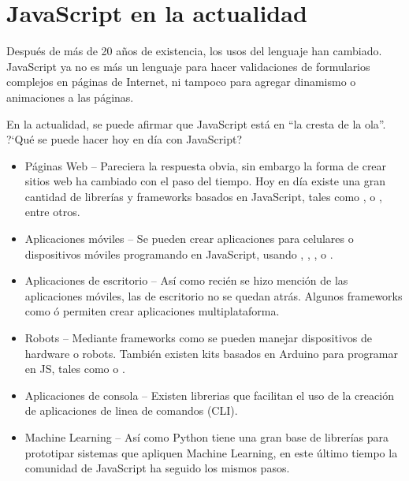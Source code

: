 \section{JavaScript en la actualidad}

Después de más de 20 años de existencia, los usos del lenguaje han cambiado. JavaScript ya no es más un lenguaje para hacer validaciones de formularios complejos en páginas de Internet, ni tampoco para agregar dinamismo o animaciones a las páginas.

En la actualidad, se puede afirmar que JavaScript está en "`la cresta de la ola"'. ?`Qué se puede hacer hoy en día con JavaScript?

\begin{itemize}
	\item Páginas Web -- Pareciera la respuesta obvia, sin embargo la forma de crear sitios web ha cambiado con el paso del tiempo. Hoy en día existe una gran cantidad de librerías y frameworks basados en JavaScript, tales como ,  o , entre otros.
	\item Aplicaciones móviles -- Se pueden crear aplicaciones para celulares o dispositivos móviles programando en JavaScript, usando , , ,  o .
	\item Aplicaciones de escritorio -- Así como recién se hizo mención de las aplicaciones móviles, las de escritorio no se quedan atrás. Algunos frameworks como  ó  permiten crear aplicaciones multiplataforma.
	\item Robots -- Mediante frameworks como  se pueden manejar dispositivos de hardware o robots. También existen kits basados en Arduino para programar en JS, tales como  o .
	\item Aplicaciones de consola -- Existen librerias que facilitan el uso de la creación de aplicaciones de linea de comandos (CLI).
	\item Machine Learning -- Así como Python tiene una gran base de librerías para prototipar sistemas que apliquen Machine Learning, en este último tiempo la comunidad de JavaScript ha seguido los mismos pasos.
\end{itemize}
